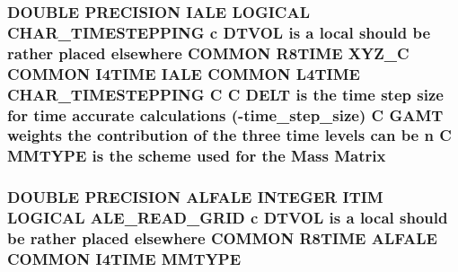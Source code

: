 \hypertarget{home_2abonfi_2_c_f_d__codes_2_eul_f_s_83_84_2include_2time_8com_ac09cc4bc02ded3a53f7730af65a96c6d}{
\subsubsection[{Matrix}]{\setlength{\rightskip}{0pt plus 5cm}D\-O\-U\-B\-L\-E P\-R\-E\-C\-I\-S\-I\-O\-N I\-A\-L\-E L\-O\-G\-I\-C\-A\-L C\-H\-A\-R\-\_\-\-T\-I\-M\-E\-S\-T\-E\-P\-P\-I\-N\-G c {\bf D\-T\-V\-O\-L} is a local should be rather placed elsewhere C\-O\-M\-M\-O\-N R8\-T\-I\-M\-E {\bf X\-Y\-Z\-\_\-\-C} C\-O\-M\-M\-O\-N I4\-T\-I\-M\-E I\-A\-L\-E C\-O\-M\-M\-O\-N L4\-T\-I\-M\-E C\-H\-A\-R\-\_\-\-T\-I\-M\-E\-S\-T\-E\-P\-P\-I\-N\-G C C {\bf D\-E\-L\-T} is the time {\bf step} size for time accurate calculations (-\/time\-\_\-step\-\_\-size) C {\bf G\-A\-M\-T} weights the contribution of the three time levels can be {\bf n} C {\bf M\-M\-T\-Y\-P\-E} is the scheme {\bf used} for the Mass Matrix}}\label{home_2abonfi_2_c_f_d__codes_2_eul_f_s_83_84_2include_2time_8com_ac09cc4bc02ded3a53f7730af65a96c6d}
\hypertarget{home_2abonfi_2_c_f_d__codes_2_eul_f_s_83_84_2include_2time_8com_a8ef2ef40e44d2eb096b5c209f6d0b1bc}{
\subsubsection[{M\-M\-T\-Y\-P\-E}]{\setlength{\rightskip}{0pt plus 5cm}D\-O\-U\-B\-L\-E P\-R\-E\-C\-I\-S\-I\-O\-N {\bf A\-L\-F\-A\-L\-E} I\-N\-T\-E\-G\-E\-R {\bf I\-T\-I\-M} L\-O\-G\-I\-C\-A\-L {\bf A\-L\-E\-\_\-\-R\-E\-A\-D\-\_\-\-G\-R\-I\-D} c {\bf D\-T\-V\-O\-L} is a local should be rather placed elsewhere C\-O\-M\-M\-O\-N R8\-T\-I\-M\-E {\bf A\-L\-F\-A\-L\-E} C\-O\-M\-M\-O\-N I4\-T\-I\-M\-E M\-M\-T\-Y\-P\-E}}\label{home_2abonfi_2_c_f_d__codes_2_eul_f_s_83_84_2include_2time_8com_a8ef2ef40e44d2eb096b5c209f6d0b1bc}

